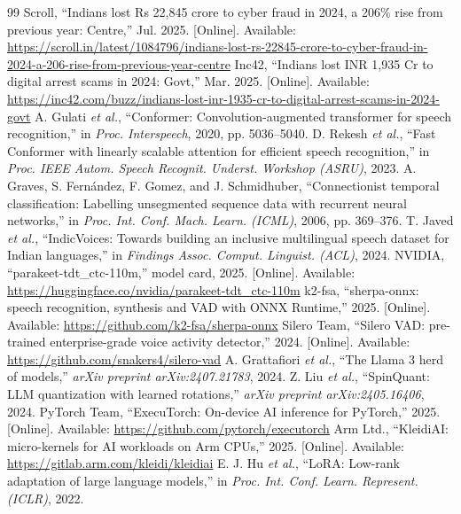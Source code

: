 \documentclass[conference]{IEEEtran}
\begin{document}
\begin{thebibliography}{99}
 Scroll, ``Indians lost Rs 22,845 crore to cyber fraud in 2024, a 206\% rise from previous year: Centre,'' Jul. 2025. [Online]. Available: \url{https://scroll.in/latest/1084796/indians-lost-rs-22845-crore-to-cyber-fraud-in-2024-a-206-rise-from-previous-year-centre}
 Inc42, ``Indians lost INR 1,935 Cr to digital arrest scams in 2024: Govt,'' Mar. 2025. [Online]. Available: \url{https://inc42.com/buzz/indians-lost-inr-1935-cr-to-digital-arrest-scams-in-2024-govt}
 A. Gulati \emph{et al.}, ``Conformer: Convolution-augmented transformer for speech recognition,'' in \emph{Proc. Interspeech}, 2020, pp. 5036--5040.
 D. Rekesh \emph{et al.}, ``Fast Conformer with linearly scalable attention for efficient speech recognition,'' in \emph{Proc. IEEE Autom. Speech Recognit. Underst. Workshop (ASRU)}, 2023.
 A. Graves, S. Fern\'andez, F. Gomez, and J. Schmidhuber, ``Connectionist temporal classification: Labelling unsegmented sequence data with recurrent neural networks,'' in \emph{Proc. Int. Conf. Mach. Learn. (ICML)}, 2006, pp. 369--376.
 T. Javed \emph{et al.}, ``IndicVoices: Towards building an inclusive multilingual speech dataset for Indian languages,'' in \emph{Findings Assoc. Comput. Linguist. (ACL)}, 2024.
 NVIDIA, ``parakeet-tdt\_ctc-110m,'' model card, 2025. [Online]. Available: \url{https://huggingface.co/nvidia/parakeet-tdt_ctc-110m}
 k2-fsa, ``sherpa-onnx: speech recognition, synthesis and VAD with ONNX Runtime,'' 2025. [Online]. Available: \url{https://github.com/k2-fsa/sherpa-onnx}
 Silero Team, ``Silero VAD: pre-trained enterprise-grade voice activity detector,'' 2024. [Online]. Available: \url{https://github.com/snakers4/silero-vad}
 A. Grattafiori \emph{et al.}, ``The Llama 3 herd of models,'' \emph{arXiv preprint arXiv:2407.21783}, 2024.
 Z. Liu \emph{et al.}, ``SpinQuant: LLM quantization with learned rotations,'' \emph{arXiv preprint arXiv:2405.16406}, 2024.
 PyTorch Team, ``ExecuTorch: On-device AI inference for PyTorch,'' 2025. [Online]. Available: \url{https://github.com/pytorch/executorch}
 Arm Ltd., ``KleidiAI: micro-kernels for AI workloads on Arm CPUs,'' 2025. [Online]. Available: \url{https://gitlab.arm.com/kleidi/kleidiai}
 E. J. Hu \emph{et al.}, ``LoRA: Low-rank adaptation of large language models,'' in \emph{Proc. Int. Conf. Learn. Represent. (ICLR)}, 2022.

\end{thebibliography}
\end{document}
